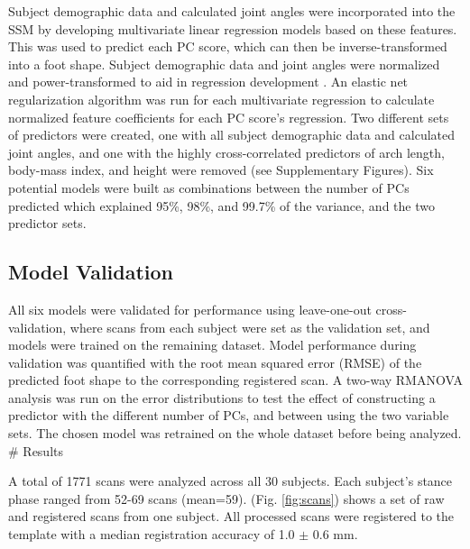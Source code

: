 \documentclass[preprint]{elsarticle}
\begin{document}
Subject demographic data and calculated joint angles were incorporated into the SSM by developing multivariate linear regression models based on these features.
This was used to predict each PC score, which can then be inverse-transformed into a foot shape.
Subject demographic data and joint angles were normalized and power-transformed to aid in regression development \citep{Yeo2000}.
An elastic net regularization algorithm \citep{Zou2005} was run for each multivariate regression to calculate normalized feature coefficients for each PC score's regression.
Two different sets of predictors were created, one with all subject demographic data and calculated joint angles, and one with the highly cross-correlated predictors of arch length, body-mass index, and height were removed (see Supplementary Figures).
Six potential models were built as combinations between the number of PCs predicted which explained 95\%, 98\%, and 99.7\% of the variance, and the two predictor sets.

\hypertarget{model-validation}{%
\subsection{Model Validation}\label{model-validation}}

All six models were validated for performance using leave-one-out cross-validation, where scans from each subject were set as the validation set, and models were trained on the remaining dataset.
Model performance during validation was quantified with the root mean squared error (RMSE) of the predicted foot shape to the corresponding registered scan.
A two-way RMANOVA analysis was run on the error distributions to test the effect of constructing a predictor with the different number of PCs, and between using the two variable sets.
The chosen model was retrained on the whole dataset before being analyzed.
\# Results

A total of 1771 scans were analyzed across all 30 subjects.
Each subject's stance phase ranged from 52-69 scans (mean=59).
(Fig. \ref{fig:scans}) shows a set of raw and registered scans from one subject.
All processed scans were registered to the template with a median registration accuracy of 1.0 \(\pm\) 0.6 mm.
\end{document}
